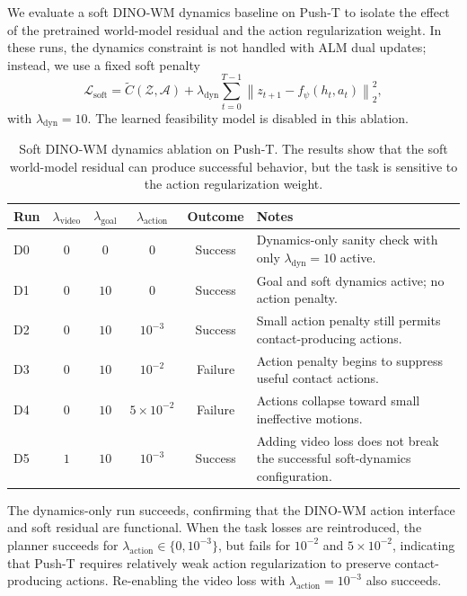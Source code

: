 We evaluate a soft DINO-WM dynamics baseline on Push-T to isolate the effect of the pretrained world-model residual and the action regularization weight. In these runs, the dynamics constraint is not handled with ALM dual updates; instead, we use a fixed soft penalty
\[
\mathcal{L}_{\mathrm{soft}}
=
\tilde C(\mathcal{Z},\mathcal{A})
+
\lambda_{\mathrm{dyn}}
\sum_{t=0}^{T-1}
\left\|
z_{t+1}-f_\psi(h_t,a_t)
\right\|_2^2,
\]
with \(\lambda_{\mathrm{dyn}}=10\). The learned feasibility model is disabled in this ablation.

\begin{table}[h]
\centering
\small
\caption{Soft DINO-WM dynamics ablation on Push-T. The results show that the soft world-model residual can produce successful behavior, but the task is sensitive to the action regularization weight.}
\label{tab:soft_dynamics_ablation_appendix}
\begin{tabular}{lccccp{}}
\toprule
Run & \(\lambda_{\mathrm{video}}\) & \(\lambda_{\mathrm{goal}}\) & \(\lambda_{\mathrm{action}}\) & Outcome & Notes \\
\midrule
D0 & \(0\) & \(0\) & \(0\) & Success 
& Dynamics-only sanity check with only \(\lambda_{\mathrm{dyn}}=10\) active. \\

D1 & \(0\) & \(10\) & \(0\) & Success 
& Goal and soft dynamics active; no action penalty. \\

D2 & \(0\) & \(10\) & \(10^{-3}\) & Success 
& Small action penalty still permits contact-producing actions. \\

D3 & \(0\) & \(10\) & \(10^{-2}\) & Failure 
& Action penalty begins to suppress useful contact actions. \\

D4 & \(0\) & \(10\) & \(5{\times}10^{-2}\) & Failure 
& Actions collapse toward small ineffective motions. \\

D5 & \(1\) & \(10\) & \(10^{-3}\) & Success 
& Adding video loss does not break the successful soft-dynamics configuration. \\
\bottomrule
\end{tabular}
\end{table}

The dynamics-only run succeeds, confirming that the DINO-WM action interface and soft residual are functional. When the task losses are reintroduced, the planner succeeds for \(\lambda_{\mathrm{action}}\in\{0,10^{-3}\}\), but fails for \(10^{-2}\) and \(5\times10^{-2}\), indicating that Push-T requires relatively weak action regularization to preserve contact-producing actions. Re-enabling the video loss with \(\lambda_{\mathrm{action}}=10^{-3}\) also succeeds.

